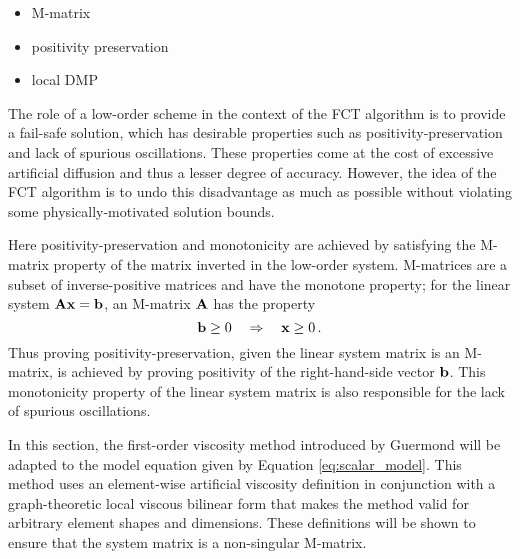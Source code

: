 \begin{itemize}
  \item M-matrix
  \item positivity preservation
  \item local DMP
\end{itemize}

The role of a low-order scheme in the context of the FCT algorithm is to
provide a fail-safe solution, which has desirable properties such as
positivity-preservation and lack of spurious oscillations. These properties
come at the cost of excessive artificial diffusion and thus a lesser degree
of accuracy. However, the idea of the FCT algorithm is to undo this disadvantage
as much as possible without violating some physically-motivated solution bounds.

Here positivity-preservation and monotonicity are achieved by satisfying
the M-matrix property of the matrix inverted in the low-order system.
M-matrices are a subset of inverse-positive matrices and have the monotone
property; for the linear system $\mathbf{A}\mathbf{x} = \mathbf{b}$, an M-matrix $\mathbf{A}$ has the property
\begin{equation}
  \mathbf{b} \geq 0 \quad \Rightarrow \quad \mathbf{x} \geq 0 \,.
\end{equation}
Thus proving positivity-preservation, given the linear system matrix is an
M-matrix, is achieved by proving positivity of the right-hand-side vector $\mathbf{b}$.
This monotonicity property of the linear system matrix is also responsible for
the lack of spurious oscillations.

In this section, the first-order viscosity method introduced by Guermond
\cite{guermond_firstorder} will be adapted to the model equation given by
Equation \eqref{eq:scalar_model}. This method uses an element-wise artificial
viscosity definition in conjunction with a graph-theoretic local viscous
bilinear form that makes the method valid for arbitrary element shapes and
dimensions. These definitions will be shown to ensure that the system matrix
is a non-singular M-matrix.

